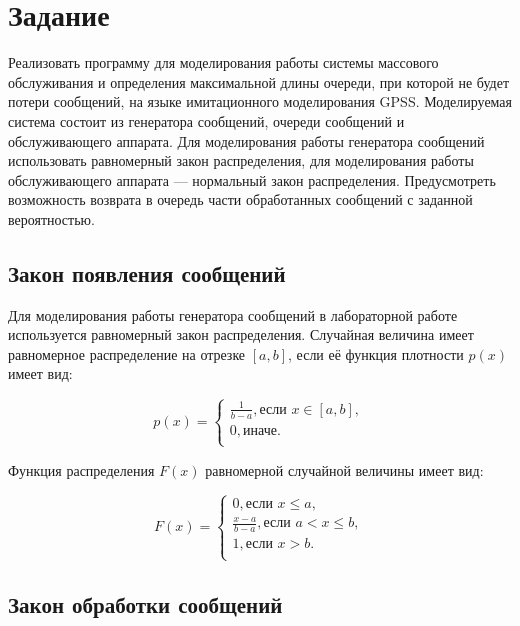 \chapter{Задание}

Реализовать программу для моделирования работы системы массового обслуживания и определения максимальной длины очереди, при которой не будет потери сообщений, на языке имитационного моделирования GPSS. Моделируемая система состоит из генератора сообщений, очереди сообщений и обслуживающего аппарата. Для моделирования работы генератора сообщений использовать равномерный закон распределения, для моделирования работы обслуживающего аппарата --- нормальный закон распределения. Предусмотреть возможность возврата в очередь части обработанных сообщений с заданной вероятностью.

\section{Закон появления сообщений}

Для моделирования работы генератора сообщений в лабораторной работе используется равномерный закон распределения. Случайная величина имеет равномерное распределение на отрезке $[a, b]$, если её функция плотности $p(x)$ имеет вид:

\begin{equation}
    p(x) = 
    \begin{cases}
        \frac{1}{b - a}, \text{если } x \in [a, b],\\
        0, \text{иначе.} \\
    \end{cases}
\end{equation}

Функция распределения $F(x)$ равномерной случайной величины имеет вид:

\begin{equation}
    F(x) = 
    \begin{cases}
    		0, \text{если } x \leqslant a, \\
        \frac{x - a}{b - a}, \text{если } a < x \leqslant b,\\
        1, \text{если } x > b. \\
    \end{cases}
\end{equation}

\section{Закон обработки сообщений}

